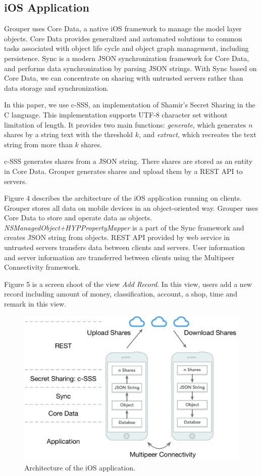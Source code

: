 \documentclass[twocolumn,10pt]{article}
\begin{document}
\subsection{iOS Application}
 Grouper uses Core Data\cite{coredata}, a native iOS framework to manage the model layer objects. Core Data provides generalized and automated solutions to common tasks associated with object life cycle and object graph management, including persistence. Sync\cite{sync} is a modern JSON synchronization framework for Core Data, and performs data synchronization by parsing JSON strings. With Sync based on Core Data, we can concentrate on sharing with untrusted servers rather than data storage and synchronization.

In this paper, we use c-SSS\cite{c-sss}, an implementation of Shamir's Secret Sharing in the C language. This implementation supports UTF-8 character set without limitation of length. It provides two main functions: \emph{generate}, which generates $n$ shares by a string text with the threshold $k$, and \emph{extract}, which recreates the text string from more than $k$ shares. 

c-SSS generates shares from a JSON string. There shares are stored as an entity in Core Data. Grouper generates shares and upload them by a REST API to servers.

Figure 4 describes the architecture of the iOS application running on clients. Grouper stores all data on mobile devices in an object-oriented way. Grouper uses Core Data to store and operate data as objects. \emph{NSManagedObject+HYPPropertyMapper} is a part of the Sync framework and creates JSON string from objects. REST API provided by web service in untrusted servers transfers data between clients and servers. User information and server information are transferred between clients using the Multipeer Connectivity framework.

Figure 5 is a screen shoot of the view \emph{Add Record}. In this view, users add a new record including amount of money, classification, account, a shop, time and remark in this view.

\begin{figure}[t]
	\centering
	\includegraphics[scale=0.35]{architecture}
	\caption{Architecture of the iOS application.}
\end{figure}
\end{document}
